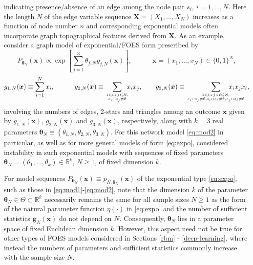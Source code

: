 \documentclass[numbib]{imamat}
\theoremstyle{theorem}
\theoremstyle{lemma}
\theoremstyle{example}
\theoremstyle{corollary}
\theoremstyle{definition}
\theoremstyle{remark}
\theoremstyle{approximation}
\theoremstyle{scheme}
\begin{document}
indicating presence/absence of an edge among the node pair \(s_i\),
\(i=1,\ldots,N\). Here the length \(N\) of the edge variable sequence
\(\boldsymbol X = (X_1,\ldots,X_N)\) increases as a function of node
number \(n\) and corresponding exponential models often incorporate
graph topographical features derived from \(\boldsymbol X\). As an
example, consider a graph model of exponential/FOES form prescribed by
\begin{equation}
\label{eq:mod2}
P_{\boldsymbol \theta_N}(\boldsymbol x) \propto
 \exp\left[\sum_{j=1}^3 \theta_{j,N} g_{j,N}(\boldsymbol x)\right], \quad\qquad \boldsymbol x=(x_1,\ldots,x_N)  \in\{0,1\}^N,
\end{equation} \[
  g_{1,N}(\boldsymbol x) \equiv \sum_{i=1}^N  x_i, \qquad\quad g_{2,N}(\boldsymbol x) \equiv \sum_{1 \leq i<j \leq N,\atop s_i \cap s_j \neq \emptyset}\!\!\!   x_i x_j, \qquad
  g_{3,N}(\boldsymbol x) \equiv \sum_{1 \leq i<j<\ell \leq N, \atop s_i \cap s_j \neq \emptyset,s_i \cap s_\ell \neq \emptyset, \\ s_j \cap s_\ell \neq \emptyset } \!\!\!\!\!\!\!\!  \!\!\!\!\!\!\!\!   x_i x_j x_\ell,
\] involving the numbers of edges, 2-stars and triangles among an
outcome \(\boldsymbol x\) given by \(g_{1,N}(\boldsymbol x)\),
\(g_{2,N}(\boldsymbol x)\) and \(g_{3,N}(\boldsymbol x)\), respectively,
along with \(k=3\) real parameters
\(\boldsymbol \theta_N \equiv (\theta_{1,N},\theta_{2,N},\theta_{3,N})\).
For this network model \eqref{eq:mod2} in particular, as well as for more
general models of form \eqref{eq:expo},
\citet{schweinberger2011instability} considered instability in such
exponential models with sequences of fixed parameters
\(\boldsymbol \theta_N = (\theta_1,\ldots,\theta_k)\in\mathbb{R}^k\),
\(N \geq 1\), of fixed dimension \(k\).

For model sequences
\(P_{\boldsymbol \theta_N}(\boldsymbol x)\equiv p_{N,\boldsymbol \theta_N}(\boldsymbol x)\)
of the exponential type \eqref{eq:expo}, such as those in
\eqref{eq:mod1}-\eqref{eq:mod2}, note that the dimension \(k\) of the
parameter \(\boldsymbol \theta_N\in\Theta \subset \mathbb{R}^k\)
necessarily remains the same for all sample sizes \(N \geq 1\) as the
form of the natural parameter function \(\eta(\cdot)\) in \eqref{eq:expo}
and the number of sufficient statistics
\(\boldsymbol g_{N}(\boldsymbol x)\) do not depend on \(N\).
Consequently, \(\boldsymbol \theta_N\) lies in a parameter space of
fixed Euclidean dimension \(k\). However, this aspect need not be true
for other types of FOES models considered in Sections \ref{rbm} -
\ref{deep-learning}, where instead the numbers of parameters and
sufficient statistics commonly increase with the sample size \(N\).
\end{document}
